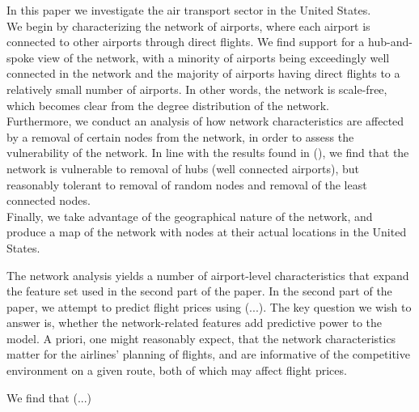 \label{sec:intro}


In this paper we investigate the air transport sector in the United States.\\ We begin by characterizing the network of airports, where each airport is connected to other airports through direct flights. We find support for a hub-and-spoke view of the network, with a minority of airports being exceedingly well connected in the network and the majority of airports having direct flights to a relatively small number of airports. In other words, the network is scale-free, which becomes clear from the degree distribution of the network. \\ Furthermore, we conduct an analysis of how network characteristics are affected by a removal of certain nodes from the network, in order to assess the vulnerability of the network. In line with the results found in (\cite{chi2004structural}), we find that the network is vulnerable to removal of hubs (well connected airports), but reasonably tolerant to removal of random nodes and removal of the least connected nodes. \\ Finally, we take advantage of the geographical nature of the network, and produce a map of the network with nodes at their actual locations in the United States. 

The network analysis yields a number of airport-level characteristics that expand the feature set used in the second part of the paper. In the second part of the paper, we attempt to predict flight prices using (...). The key question we wish to answer is, whether the network-related features add predictive power to the model. A priori, one might reasonably expect, that the network characteristics matter for the airlines' planning of flights, and are informative of the competitive environment on a given route, both of which may affect flight prices. 

We find that (...)

